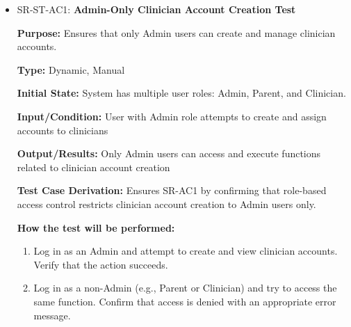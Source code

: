 \documentclass[12pt, titlepage]{article}
\begin{document}
\begin{itemize}
  \item SR-ST-AC1: \textbf{Admin-Only Clinician Account Creation Test}
  \begin{mdframed}[linewidth=0.5mm]
      \textbf{Purpose:} Ensures that only Admin users can create and manage clinician accounts. \par
      \textbf{Type:} Dynamic, Manual \par
      \textbf{Initial State:} System has multiple user roles: Admin, Parent, and Clinician. \par
      \textbf{Input/Condition:} User with Admin role attempts to create and assign accounts to clinicians \par
      \textbf{Output/Results:} Only Admin users can access and execute functions related 
      to clinician account creation \par
      \textbf{Test Case Derivation:} Ensures SR-AC1 by confirming that role-based access control restricts clinician account creation to Admin users only. \par
      \textbf{How the test will be performed:}
      \begin{enumerate}[noitemsep]
        \item Log in as an Admin and attempt to create and view clinician accounts. Verify that the action succeeds.
        \item Log in as a non-Admin (e.g., Parent or Clinician) and try to access the same function. Confirm that access is denied with an appropriate error message.
      \end{enumerate}
  \end{mdframed}


\end{itemize}
\end{document}
